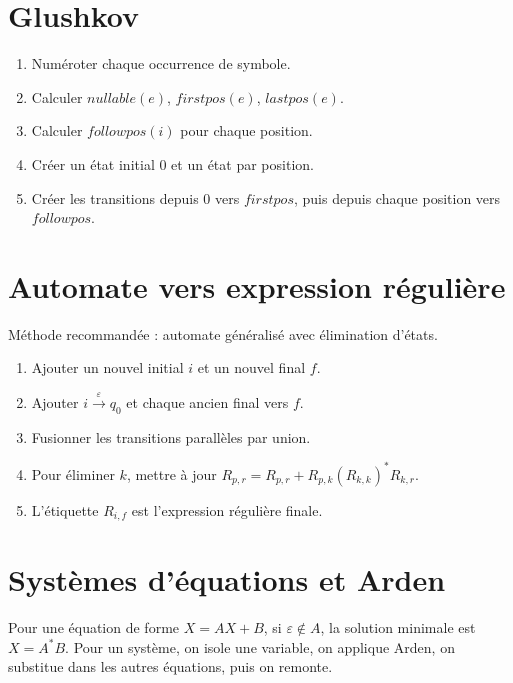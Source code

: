 \documentclass[11pt,a4paper]{report}
\newcommand{\eps}{\ensuremath{\varepsilon}}
\begin{document}
\section{Glushkov}
\begin{enumerate}
  \item Numéroter chaque occurrence de symbole.
  \item Calculer $nullable(e)$, $firstpos(e)$, $lastpos(e)$.
  \item Calculer $followpos(i)$ pour chaque position.
  \item Créer un état initial $0$ et un état par position.
  \item Créer les transitions depuis $0$ vers $firstpos$, puis depuis chaque position vers $followpos$.
\end{enumerate}

\section{Automate vers expression régulière}
Méthode recommandée : automate généralisé avec élimination d'états.
\begin{enumerate}
  \item Ajouter un nouvel initial $i$ et un nouvel final $f$.
  \item Ajouter $i \xrightarrow{\eps} q_0$ et chaque ancien final vers $f$.
  \item Fusionner les transitions parallèles par union.
  \item Pour éliminer $k$, mettre à jour $R_{p,r}=R_{p,r}+R_{p,k}(R_{k,k})^*R_{k,r}$.
  \item L'étiquette $R_{i,f}$ est l'expression régulière finale.
\end{enumerate}

\section{Systèmes d'équations et Arden}
Pour une équation de forme $X=AX+B$, si $\eps \notin A$, la solution minimale est $X=A^*B$. Pour un système, on isole une variable, on applique Arden, on substitue dans les autres équations, puis on remonte.
\end{document}

